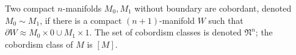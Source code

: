 Two compact $n$-manifolds $M_0, M_1$ without boundary are cobordant, denoted $M_0 \sim M_1$, if there is a compact $(n+1)$-manifold $W$ such that $\partial W \approx M_0 \times 0 \cup M_1 \times 1$. The set of cobordism classes is denoted $\mathfrak{N}^n$; the cobordism class of $M$ is $[M]$.
